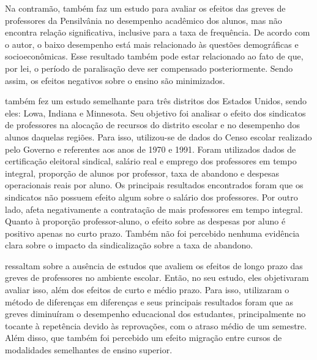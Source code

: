Na contramão,  também faz um estudo para avaliar os efeitos das greves de professores da Pensilvânia no desempenho acadêmico dos alunos, mas não encontra relação significativa, inclusive para a taxa de frequência. De acordo com o autor, o baixo desempenho está mais relacionado às questões demográficas e socioeconômicas. Esse resultado também pode estar relacionado ao fato de que, por lei, o período de paralisação deve ser compensado posteriormente. Sendo assim, os efeitos negativos sobre o ensino são minimizados.

 também fez um estudo semelhante para três distritos dos Estados Unidos, sendo eles: Lowa, Indiana e Minnesota. Seu objetivo foi analisar o efeito dos sindicatos de professores na alocação de recursos do distrito escolar e no desempenho dos alunos daquelas regiões. Para isso, utilizou-se de dados do Censo escolar realizado pelo Governo e referentes aos anos de 1970 e 1991. Foram utilizados dados de certificação eleitoral sindical, salário real e emprego dos professores em tempo integral, proporção de alunos por professor, taxa de abandono e despesas operacionais reais por aluno. Os principais resultados encontrados foram que os sindicatos não possuem efeito algum sobre o salário dos professores. Por outro lado, afeta negativamente a contratação de mais professores em tempo integral. Quanto à proporção professor-aluno, o efeito sobre as despesas por aluno é positivo apenas no curto prazo. Também não foi percebido nenhuma evidência clara sobre o impacto da sindicalização sobre a taxa de abandono.

 ressaltam sobre a ausência de estudos que avaliem os efeitos de longo prazo das greves de professores no ambiente escolar. Então, no seu estudo, eles objetivaram avaliar isso, além dos efeitos de curto e médio prazo. Para isso, utilizaram o método de diferenças em diferenças e seus principais resultados foram que as greves diminuíram o desempenho educacional dos estudantes, principalmente no tocante à repetência devido às reprovações, com o atraso médio de um semestre. Além disso, que também foi percebido um efeito migração entre cursos de modalidades semelhantes de ensino superior.

